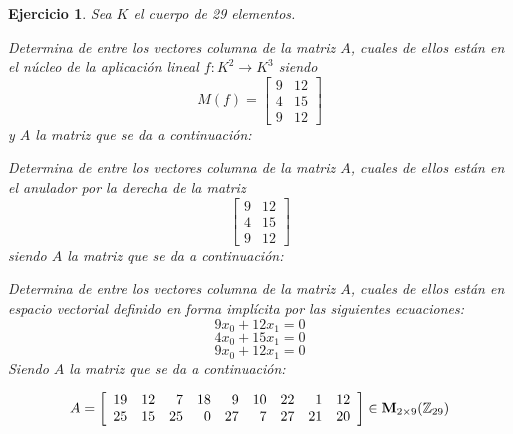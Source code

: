 \documentclass[12pt]{amsart}
\newtheorem{ejer}{Ejercicio}
\begin{document}
\begin{ejer} Sea $K$ el cuerpo de 29 elementos.
\newline
\noindent\begin{minipage}{\textwidth}
\begin{tcolorbox}[colback = green!20!white,title=Versión Núcleo]
Determina de entre los vectores columna de la matriz $A$, cuales de ellos están en el núcleo de la aplicación lineal $f:K^{2} \to K^{3}$ siendo  $$ M(f) = \left[\begin{array}{rr}
9 & 12 \\
4 & 15 \\
9 & 12
\end{array}\right] $$ y $A$ la matriz que se da a continuación:\end{tcolorbox}
\end{minipage} \newline
\noindent\begin{minipage}{\textwidth}
\begin{tcolorbox}[colback = blue!20!white,title=Versión Anulador]
Determina de entre los vectores columna de la matriz $A$, cuales de ellos están en el anulador por la derecha de la matriz $$ \left[\begin{array}{rr}
9 & 12 \\
4 & 15 \\
9 & 12
\end{array}\right] $$ siendo $A$ la matriz que se da a continuación:\end{tcolorbox}
\end{minipage} \newline
\noindent\begin{minipage}{\textwidth} 
\begin{tcolorbox}[colback = red!20!white,title=Versión Ecuaciones Implícitas]
Determina de entre los vectores columna de la matriz $A$, cuales de ellos están en espacio vectorial definido en forma implícita por las siguientes ecuaciones:
\[ 9 x_{0} + 12 x_{1} = 0 \]
\[ 4 x_{0} + 15 x_{1} = 0 \]
\[ 9 x_{0} + 12 x_{1} = 0 \]
Siendo $A$ la matriz que se da a continuación:
\end{tcolorbox}
\end{minipage}
\[ A = \left[\begin{array}{rrrrrrrrr}
19 & 12 & 7 & 18 & 9 & 10 & 22 & 1 & 12 \\
25 & 15 & 25 & 0 & 27 & 7 & 27 & 21 & 20
\end{array}\right] \in {\bf M}_{2\times 9}({\mathbb Z}_{29})\]
\end{ejer}
\end{document}
